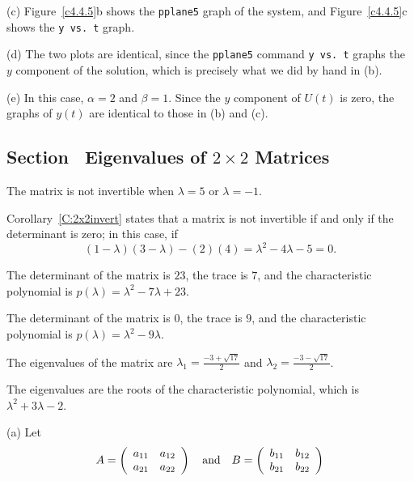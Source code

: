 \documentclass{ximera}
\begin{document}
(c) Figure~\ref{c4.4.5}b shows the {\tt pplane5} graph of the system,
and Figure~\ref{c4.4.5}c shows the {\tt y vs.\ t} graph.

(d) The two plots are identical, since the {\tt pplane5} command
{\tt y vs.\ t} graphs the $y$ component of the solution, which is
precisely what we did by hand in (b).

(e) In this case, $\alpha = 2$ and $\beta = 1$.  Since the $y$
component of $U(t)$ is zero, the graphs of $y(t)$ are identical
to those in (b) and (c).

\begin{figure}[htb]
                       \centerline{%
                       }
\end{figure}



\subsection*{Section~\protect{\ref{S:evchp}} Eigenvalues of $2\times 2$ Matrices}

\ans The matrix is not invertible when $\lambda = 5$ or $\lambda = -1$.

\soln Corollary~\ref{C:2x2invert} states that a matrix is not invertible
if and only if the determinant is zero; in this case, if
\[
(1 - \lambda)(3 - \lambda) - (2)(4) = \lambda^2 - 4\lambda - 5 = 0.
\]

\newpage
{} The determinant of the matrix is $23$, the trace is $7$, and
the characteristic polynomial is $p(\lambda)=\lambda^2-7\lambda+23$.

 The determinant of the matrix is $0$, the trace is $9$, and
the characteristic polynomial is $p(\lambda)=\lambda^2-9\lambda$.

 \ans The eigenvalues of the matrix are
$\lambda_1 = \frac{-3 + \sqrt{17}}{2}$ and $\lambda_2 =
\frac{-3 - \sqrt{17}}{2}$.

\soln The eigenvalues are the roots of the characteristic polynomial, which
is $\lambda^2 + 3\lambda - 2$.

(a) Let
\[
A = \left(\begin{array}{rr} a_{11} & a_{12}\\ a_{21} &a_{22}\end{array}\right) \quad\mbox{and}\quad
B = \left(\begin{array}{rr} b_{11} & b_{12}\\ b_{21} &b_{22}\end{array}\right)
\]
\end{document}
